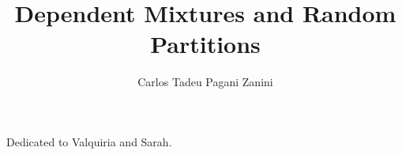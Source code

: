 \documentclass[12pt]{report}	%
\author{Carlos Tadeu Pagani Zanini}  	%
\title{Dependent Mixtures and Random Partitions}
\theoremstyle{definition}
\theoremstyle{remark}
\begin{document}
\copyrightpage          %


%
%
%
\commcertpage           %

\titlepage              %



%
\begin{dedication}
%
Dedicated to Valquiria and Sarah.
\end{dedication}
\end{document}
